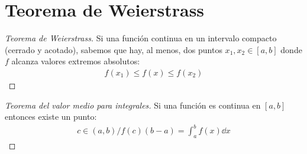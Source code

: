\documentclass{article}
\begin{document}
\section{Teorema de Weierstrass}
\begin{proof}[Teorema de Weierstrass]
    Si una función continua en un intervalo compacto (cerrado y acotado), sabemos que hay, al menos, dos puntos
    $x_{1},x_{2} \in [a,b]$ donde $f$ alcanza valores extremos absolutos:
    \begin{equation}
        \begin{split}
            f(x_{1}) \leq f(x) \leq f(x_{2})
        \end{split}
    \end{equation}
\end{proof}
\begin{proof}[Teorema del valor medio para integrales]
    Si una función es continua en $[a,b]$ entonces existe un punto:
    \begin{equation}
        \begin{split}
            c \in (a,b) / f(c)(b-a) = \int_{a}^b f(x) \dd{x}
        \end{split}
    \end{equation}
\end{proof}
\end{document}
